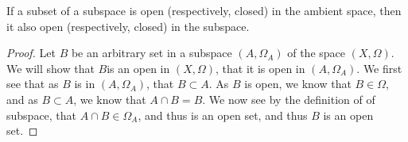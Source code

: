 \begin{minorEx}%
If a subset of a subspace is open (respectively, closed) in the ambient space, then it also open (respectively, closed) in the subspace.
\end{minorEx}

\begin{proof}
  Let $B$ be an arbitrary set in a subspace $(A,\Omega_A)$ of the
  space $(X,\Omega)$. We will show that $B$is an open in $(X,\Omega)$,
  that it is open in $(A,\Omega_A)$. We first see that as $B$ is in
  $(A,\Omega_A)$, that $B \subset A$. As $B$ is open, we know that
  $B\in \Omega$, and as $B \subset A$, we know that $A\cap B=B$. We
  now see by the definition of of subspace, that $A\cap B \in
  \Omega_A$, and thus is an open set, and thus $B$ is an open set.
\end{proof}



